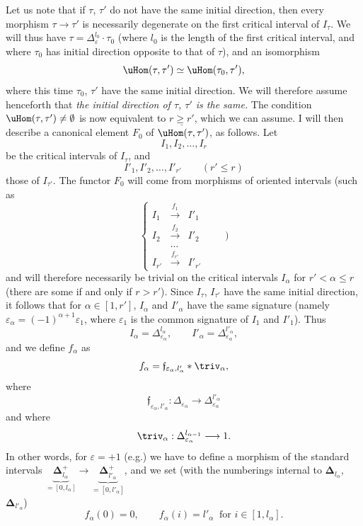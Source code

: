 Let us note that if $\tau$, $\tau'$ do not have the same initial direction, then every morphism $\tau\longrightarrow\tau'$ is necessarily degenerate on the first critical interval of $I_\tau$. We will thus have $\tau=\Delta_\varepsilon^{l_0}\cdot\tau_0$ (where $l_0$ is the length of the first critical interval, and where $\tau_0$ has initial direction opposite to that of $\tau$), and an isomorphism
\[
\uHom(\tau,\tau')\simeq\uHom(\tau_0,\tau'),
\]
where this time $\tau_0$, $\tau'$ have the same initial direction. We will therefore assume henceforth that \textit{the initial direction of $\tau$, $\tau'$ is the same.} The condition $\uHom(\tau,\tau')\neq\emptyset$ is now equivalent to $\underline{r\geq r'}$, which we can assume. I will then describe a canonical element
$F_0$ of $\uHom(\tau,\tau')$, as follows. Let
\[
I_1,I_2,\dots,I_r
\]
be the critical intervals of $I_\tau$, and
\[
I'_1,I'_2,\dots,I'_{r'}\qquad(r'\leq r)
\]
those of $I_{\tau'}$. The functor $F_0$ will come from morphisms of oriented intervals (such as
\[
\left\{
\begin{array}{ccc}
I_1 & \xrightarrow{f_1} & I'_1\\[4pt]
I_2 & \xrightarrow{f_2} & I'_2\\[4pt]
 & \dots & \\[4pt]
I_{r'} & \xrightarrow{f_{r'}} & I'_{r'}
\end{array}
\right.\qquad)
\]
and will therefore necessarily be trivial on the critical intervals $I_\alpha$ for $r'<\alpha\leq r$ (there are some if and only if $r>r'$). Since $I_\tau$, $I_{\tau'}$ have the same initial direction, it follows that for $\alpha\in[1,r']$, $I_\alpha$ and $I'_\alpha$ have the same signature (namely $\varepsilon_\alpha=(-1)^{\alpha+1}\varepsilon_1$, where $\varepsilon_1$ is the common signature of $I_1$ and $I'_1$). Thus
\[
I_\alpha=\Delta^{l_\alpha}_{\varepsilon_\alpha},\qquad I'_\alpha=\Delta^{l'_\alpha}_{\varepsilon_\alpha},
\]
and we define $f_\alpha$ as
\[
f_\alpha=\mathfrak{f}_{\varepsilon_\alpha,l'_\alpha}*\triv_\alpha,
\]
where
\[
\mathfrak{f}_{\varepsilon_\alpha,l'_\alpha}:\Delta_{\varepsilon_\alpha}\longrightarrow\Delta^{l'_\alpha}_{\varepsilon_\alpha}
\]
and where
\[
\triv_\alpha:\Delta^{l_{\alpha-1}}_{\varepsilon_\alpha}\longrightarrow1. %
\]
In other words, for $\varepsilon=+1$ (e.g.) we have to define a morphism of the standard intervals $\underbrace{\mathbf{\Delta}^+_{l_\alpha}}_{=[0,l_\alpha]}\longrightarrow\underbrace{\mathbf{\Delta}^+_{l'_\alpha}}_{=[0,l'_\alpha]}$, and we set (with the numberings internal to $\mathbf{\Delta}_{l_\alpha}$, $\mathbf{\Delta}_{l'_\alpha}$)
\[
f_\alpha(0)=0,\qquad f_\alpha(i)=l'_\alpha\ \text{ for }i\in[1,l_\alpha].
\]

